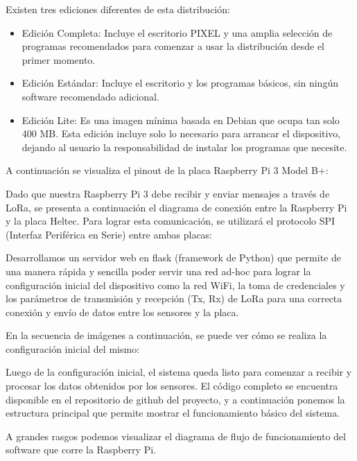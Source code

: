 Existen tres ediciones diferentes de esta distribución:

\begin{itemize}
    \item Edición Completa: Incluye el escritorio PIXEL y una amplia selección de programas recomendados para comenzar a usar la distribución desde el primer momento.
    \item Edición Estándar: Incluye el escritorio y los programas básicos, sin ningún software recomendado adicional.
    \item Edición Lite: Es una imagen mínima basada en Debian que ocupa tan solo 400 MB. Esta edición incluye solo lo necesario para arrancar el dispositivo, dejando al usuario la responsabilidad de instalar los programas que necesite.
\end{itemize}

A continuación se visualiza el pinout de la placa Raspberry Pi 3 Model B+:


Dado que nuestra Raspberry Pi 3 debe recibir y enviar mensajes a través de LoRa, se presenta a continuación el diagrama de conexión entre la Raspberry Pi y la placa Heltec. Para lograr esta comunicación, se utilizará el protocolo SPI (Interfaz Periférica en Serie) entre ambas placas:


Desarrollamos un servidor web en flask (framework de Python) que permite de una manera rápida y sencilla poder servir una red ad-hoc para lograr la configuración inicial del dispositivo como la red WiFi, la toma de credenciales y los parámetros de transmisión y recepción (Tx, Rx) de LoRa para una correcta conexión y envío de datos entre los sensores y la placa.

En la secuencia de imágenes a continuación, se puede ver cómo se realiza la configuración inicial del mismo:

Luego de la configuración inicial, el sistema queda listo para comenzar a recibir y procesar los datos obtenidos por los sensores. El código completo se encuentra disponible en el repositorio de github del proyecto, y a continuación ponemos la estructura principal que permite mostrar el funcionamiento básico del sistema.

A grandes rasgos podemos visualizar el diagrama de flujo de funcionamiento del software que corre la Raspberry Pi.


